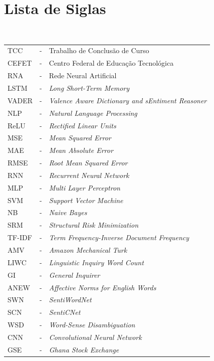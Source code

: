 \section*{Lista de Siglas}

\singlespacing

\\

\noindent
\begin{tabular}{l c p{.85\linewidth}}

TCC & - & Trabalho de Conclusão de Curso \\
CEFET & - & Centro Federal de Educação Tecnológica \\
RNA & - & Rede Neural Artificial \\
LSTM & - & \textit{Long Short-Term Memory} \\
VADER & - & \textit{Valence Aware Dictionary and sEntiment Reasoner} \\
NLP & - & \textit{Natural Language Processing} \\
ReLU & - & \textit{Rectified Linear Units} \\
MSE & - & \textit{Mean Squared Error} \\
MAE & - & \textit{Mean Absolute Error} \\
RMSE & - & \textit{Root Mean Squared Error} \\
RNN & - & \textit{Recurrent Neural Network} \\
MLP & - & \textit{Multi Layer Perceptron} \\
SVM & - & \textit{Support Vector Machine} \\
NB & - & \textit{Naive Bayes} \\
SRM & - & \textit{Structural Risk Minimization} \\
TF-IDF & - & \textit{Term Frequency-Inverse Document Frequency} \\
AMV & - & \textit{Amazon Mechanical Turk} \\
LIWC & - & \textit{Linguistic Inquiry Word Count} \\
GI & - & \textit{General Inquirer} \\
ANEW & - & \textit{Affective Norms for English Words} \\
SWN & - & \textit{SentiWordNet} \\
SCN & - & \textit{SentiCNet} \\
WSD & - & \textit{Word-Sense Disambiguation} \\
CNN & - & \textit{Convolutional Neural Network} \\
GSE & - & \textit{Ghana Stock Exchange} \\

\end{tabular}

\onehalfspacing